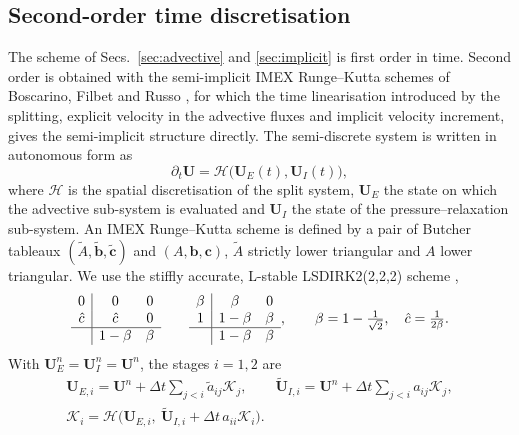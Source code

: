\subsection{Second-order time discretisation}
\label{sec:time}
The scheme of Secs.~\ref{sec:advective} and \ref{sec:implicit} is first order in time. Second order is obtained with
the semi-implicit IMEX Runge--Kutta schemes of Boscarino, Filbet and Russo \cite{BoscarinoFilbetRusso2016}, for which the
time linearisation introduced by the splitting, explicit velocity in the advective fluxes and implicit velocity
increment, gives the semi-implicit structure directly. The semi-discrete system is written in autonomous form as
\begin{equation}
\partial_t\mathbf U=\mathcal H\big(\mathbf U_E(t),\mathbf U_I(t)\big),
\label{eq:autonomous}
\end{equation}
where $\mathcal H$ is the spatial discretisation of the split system, $\mathbf U_E$ the state on which the advective sub-system
is evaluated and $\mathbf U_I$ the state of the pressure--relaxation sub-system. An IMEX Runge--Kutta scheme
\cite{Ascher1997,PareschiRusso2005} is defined by a pair of Butcher tableaux $(\tilde A,\tilde{\mathbf b},\tilde{\mathbf c})$ and
$(A,\mathbf b,\mathbf c)$, $\tilde A$ strictly lower triangular and $A$ lower triangular. We use the stiffly accurate, L-stable
LSDIRK2(2,2,2) scheme \cite{BoscarinoFilbetRusso2016,Avgerinos2019},
\begin{equation}
\begin{array}{c|cc}0&0&0\\ \hat c&\hat c&0\\\hline &1-\beta&\beta\end{array}\qquad
\begin{array}{c|cc}\beta&\beta&0\\ 1&1-\beta&\beta\\\hline &1-\beta&\beta\end{array},\qquad \beta=1-\tfrac1{\sqrt2},\quad \hat c=\tfrac1{2\beta}.
\label{eq:lsdirk}
\end{equation}
With $\mathbf U^n_E=\mathbf U^n_I=\mathbf U^n$, the stages $i=1,2$ are
\begin{equation}
\begin{gathered}
\mathbf U_{E,i}=\mathbf U^n+\Delta t\sum_{j<i}\tilde a_{ij}\mathcal K_j,\qquad \tilde{\mathbf U}_{I,i}=\mathbf U^n+\Delta t\sum_{j<i}a_{ij}\mathcal K_j,\\
\mathcal K_i=\mathcal H\big(\mathbf U_{E,i},\ \tilde{\mathbf U}_{I,i}+\Delta t\,a_{ii}\mathcal K_i\big).
\end{gathered}
\label{eq:stages}
\end{equation}
